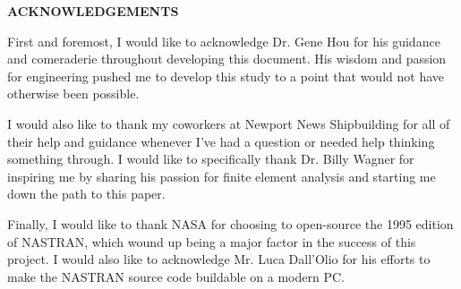 
{\LARGE\center
  \textbf{\uppercase{Acknowledgements}}\par
}
\vspace{2.5cm}

First and foremost, I would like to acknowledge Dr. Gene Hou for his guidance and comeraderie throughout developing this document. His wisdom and passion for engineering pushed me to develop this study to a point that would not have otherwise been possible. 

I would also like to thank my coworkers at Newport News Shipbuilding for all of their help and guidance whenever I've had a question or needed help thinking something through. I would like to specifically thank Dr. Billy Wagner for inspiring me by sharing his passion for finite element analysis and starting me down the path to this paper. 

Finally, I would like to thank NASA for choosing to open-source the 1995 edition of NASTRAN, which wound up being a major factor in the success of this project. I would also like to acknowledge Mr. Luca Dall'Olio for his efforts to make the NASTRAN source code buildable on a modern PC. 


